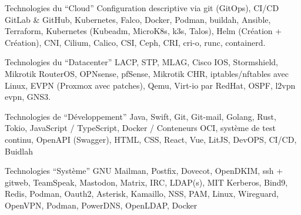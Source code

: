 
\begin{cvskills}

  \cvskill
    {Technologies du ``Cloud''}
    {
      Configuration descriptive via git (GitOps), CI/CD GitLab \& GitHub, \break
      Kubernetes, Falco, Docker, Podman, buildah, Ansible, Terraform, Kubernetes \break
      (Kubeadm, MicroK8s, k3s, Talos), Helm (Création + Création), \break 
      CNI, Cilium, Calico, CSI, Ceph, CRI, cri-o, runc, containerd.
    }

    \cvskill
    {Technologies du ``Datacenter''}
    {
      LACP, STP, MLAG, Cisco IOS, Stormshield, Mikrotik RouterOS, OPNsense, \break
      pfSense, Mikrotik CHR, iptables/nftables avec Linux, \break 
      EVPN (Proxmox avec patches), Qemu, Virt-io par RedHat, OSPF, \break
      l2vpn evpn, GNS3.
    }

    \cvskill
    {Technologies de ``Développement''}
    {
      Java, Swift, Git, Git-mail, Golang, Rust, Tokio, JavaScript / TypeScript, \break 
      Docker / Conteneurs OCI, système de test continu, OpenAPI (Swagger), HTML, \break
       CSS, React, Vue, LitJS, DevOPS, CI/CD, Buidlah
    }

    \cvskill
    {Technologies ``Système''}
    {
      GNU Mailman, Postfix, Dovecot, OpenDKIM, ssh + gitweb, TeamSpeak, \break
       Mastodon, Matrix, IRC, LDAP(s), MIT Kerberos, Bind9, Redis, Podman, \break
       Oauth2, Asterisk, Kamaillo, NSS, PAM, Linux, Wireguard, OpenVPN,  \break
       Podman, PowerDNS, OpenLDAP, Docker
    }

\end{cvskills}
